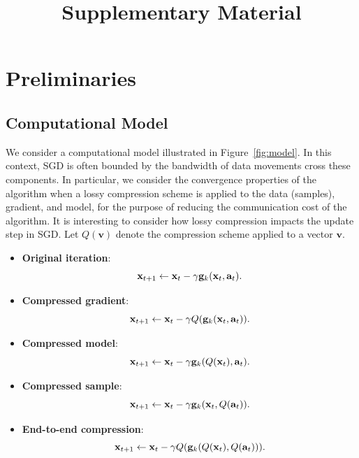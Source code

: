 \documentclass{article}
\date{}
\title{\Large \bf
Supplementary Material
}
\renewcommand{\vec}[1]{\mathbf{#1}}
\def\g{{\bf g}}
\def\x{{\bf x}}
\begin{document}
\maketitle

\section{Preliminaries}

\subsection{Computational Model}

We consider a computational model illustrated in
Figure~\ref{fig:model}.  
In this context, SGD is often bounded by the bandwidth
of data movements cross these components. 
In particular, we consider the convergence properties of the algorithm when a lossy compression scheme is applied to the data (samples), 
gradient, and model, for the purpose of reducing the communication cost of the algorithm. 
It is interesting to consider how lossy compression impacts the update step in SGD. Let $Q( \vec{v} )$ denote the compression scheme applied to a vector $\vec{v}$. 

\begin{itemize}
    \item \textbf{Original iteration}: $$\x_{t + 1} \leftarrow \x_t - \gamma \g_k (\x_t, \vec{a}_t).$$
    \item \textbf{Compressed gradient}: $$\x_{t + 1} \leftarrow \x_t - \gamma Q( \g_k (\x_t, \vec{a}_t) ).$$
    \item \textbf{Compressed model}: $$\x_{t + 1} \leftarrow \x_t - \gamma \g_k (Q(\x_t), \vec{a}_t).$$
    \item \textbf{Compressed sample}: $$\x_{t + 1} \leftarrow \x_t - \gamma \g_k (\x_t, Q(\vec{a}_t)).$$
    \item \textbf{End-to-end compression}: $$\x_{t + 1} \leftarrow \x_t - \gamma Q(\g_k (Q(\x_t), Q(\vec{a}_t))).$$
\end{itemize}
\end{document}
